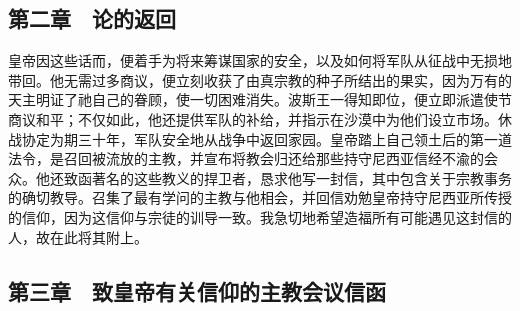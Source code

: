 
\subsection{第二章　论的返回}

皇帝因这些话而，便着手为将来筹谋国家的安全，以及如何将军队从征战中无损地带回。他无需过多商议，便立刻收获了由真宗教的种子所结出的果实，因为万有的天主明证了祂自己的眷顾，使一切困难消失。波斯王一得知即位，便立即派遣使节商议和平；不仅如此，他还提供军队的补给，并指示在沙漠中为他们设立市场。休战协定为期三十年，军队安全地从战争中返回家园。皇帝踏上自己领土后的第一道法令，是召回被流放的主教，并宣布将教会归还给那些持守尼西亚信经不渝的会众。他还致函著名的这些教义的捍卫者，恳求他写一封信，其中包含关于宗教事务的确切教导。召集了最有学问的主教与他相会，并回信劝勉皇帝持守尼西亚所传授的信仰，因为这信仰与宗徒的训导一致。我急切地希望造福所有可能遇见这封信的人，故在此将其附上。\par


\subsection{第三章　致皇帝有关信仰的主教会议信函}

